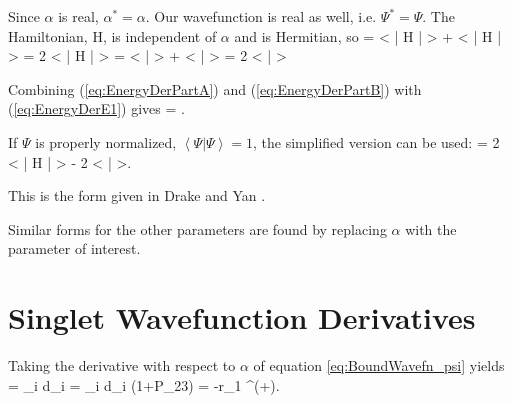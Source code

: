 \documentclass[Dissertation.tex]{subfiles}
\begin{document}
Since $\alpha$ is real, $\alpha^* = \alpha$.  Our wavefunction is real as well, i.e. $\Psi^* = \Psi$.  The Hamiltonian, H, is independent of $\alpha$ and is Hermitian, so
\beq
{} = \left< \Psi \Big| H \Big| \frac{\partial\Psi}{\partial \alpha} \right> + 
    \left< \frac{\partial\Psi}{\partial \alpha} \Big| H \Big| \Psi \right> = 2 \left< \Psi \Big| H \Big| \frac{\partial\Psi}{\partial \alpha} \right>
\label{eq:EnergyDerPartA}
\eeq
\beq
{} = \left< \Psi \Big| \frac{\partial\Psi}{\partial \alpha} \right> + 
    \left< \frac{\partial\Psi}{\partial \alpha} \Big| \Psi \right> = 2 \left< \Psi \Big| \frac{\partial\Psi}{\partial \alpha} \right>
\label{eq:EnergyDerPartB}
\eeq

Combining (\ref{eq:EnergyDerPartA}) and (\ref{eq:EnergyDerPartB}) with (\ref{eq:EnergyDerE1}) gives
\beq
{} = .
\label{eq:EnergyDerivative}
\eeq

\noindent If $\Psi$ is properly normalized, $\left< \Psi \Big| \Psi \right> = 1$, the simplified version can be used:
\beq
{} = 2 \left< \Psi \Big| H \Big| \frac{\partial\Psi}{\partial \alpha} \right> - 2 \left< \Psi \Big| \frac{\partial\Psi}{\partial \alpha} \right>.
\label{eq:EnergyDerivativeNorm}
\eeq

\noindent This is the form given in Drake and Yan \cite{Drake1995}.

Similar forms for the other parameters are found by replacing $\alpha$ with the parameter of interest.

\section{Singlet Wavefunction Derivatives}
Taking the derivative with respect to $\alpha$ of equation \ref{eq:BoundWavefn_psi} yields
\beq
\frac{\partial \Psi^+}{\partial \alpha} = \sum_i d_i  = \sum_i d_i (1+P_{23})  = -r_1 \Psi^{(+)}.
\label{eq:PsiDerAlpha}
\eeq
\end{document}
